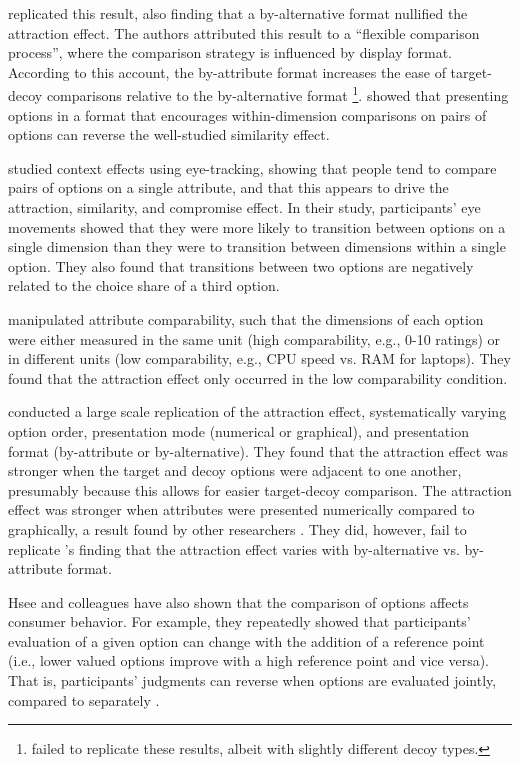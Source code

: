 \textcite{cataldoComparisonProcessAccount2019b} replicated this result, also finding that a by-alternative format nullified the attraction effect. The authors attributed this result to a “flexible comparison process”, where the comparison strategy is influenced by display format. According to this account, the by-attribute format increases the ease of target-decoy comparisons relative to the by-alternative format \footnote{\textcite{hasan2025registered} failed to replicate these results, albeit with slightly different decoy types.}. \textcite{cataldoReversingSimilarityEffect2018b} showed that presenting options in a format that encourages within-dimension comparisons on pairs of options can reverse the well-studied similarity effect.

\textcite{noguchi2014attraction} studied context effects using eye-tracking, showing that people tend to compare pairs of options on a single attribute, and that this appears to drive the attraction, similarity, and compromise effect. In their study, participants' eye movements showed that they were more likely to transition between options on a single dimension than they were to transition between dimensions within a single option. They also found that transitions between two options are negatively related to the choice share of a third option.

\textcite{hayes2024attribute} manipulated attribute comparability, such that the dimensions of each option were either measured in the same unit (high comparability, e.g., 0-10 ratings) or in different units (low comparability, e.g., CPU speed vs. RAM for laptops). They found that the attraction effect only occurred in the low comparability condition. 

\textcite{hasan2025registered} conducted a large scale replication of the attraction effect, systematically varying option order, presentation mode (numerical or graphical), and presentation format (by-attribute or by-alternative). They found that the attraction effect was stronger when the target and decoy options were adjacent to one another, presumably because this allows for easier target-decoy comparison. The attraction effect was stronger when attributes were presented numerically compared to graphically, a result found by other researchers \parencite{frederickLimitsAttraction2014b,yangMoreEvidenceChallenging2014}. They did, however, fail to replicate \textcite{cataldo}'s finding that the attraction effect varies with by-alternative vs. by-attribute format.

Hsee and colleagues \parencite{hseeEvaluabilityHypothesisExplanation1996,hseeLessBetterWhen1998,hseeWillProductsLook1998,hsee1999preference} have also shown that the comparison of options affects consumer behavior. For example, they repeatedly showed that participants’ evaluation of a given option can change with the addition of a reference point (i.e., lower valued options improve with a high reference point and vice versa). That is, participants’ judgments can reverse when options are evaluated jointly, compared to separately \parencite{hsee1999preference}. 

